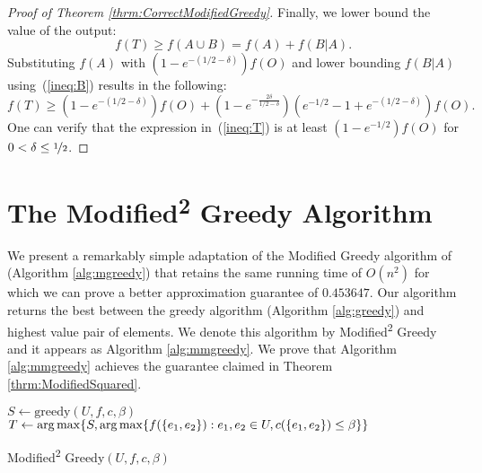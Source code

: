\documentclass[a4paper,UKenglish,cleveref, autoref]{lipics-v2019}
\begin{document}
\begin{proof}[Proof of Theorem \ref{thrm:CorrectModifiedGreedy}]
	Finally, we lower bound the value of the output:
	\begin{equation}
		f(T) \geq f(A \cup B) = f(A) + f(B | A).
	\end{equation}	
	Substituting $f(A)$ with $(1 - e^{-(1/2 - \delta)})f(O)$ and lower bounding $f(B|A)$ using~(\ref{ineq:B}) results in the following:
	\begin{equation}
		\label{ineq:T}
		f(T) \geq (1 - e^{-(1/2 - \delta)})f(O) + (1 - e^{-\frac{2\delta}{1/2 - \delta}})(e^{-1/2} - 1 + e^{-(1/2 - \delta)})f(O).
	\end{equation}
	One can verify that the expression in~(\ref{ineq:T}) is at least $(1-e^{-1/2})f(O)$ for $0 < \delta \leq \nicefrac[]{1}{2}$.
\end{proof}



\section{The Modified\textsuperscript{2} Greedy Algorithm}\label{sec:Modified2Greedy}
We present a remarkably simple adaptation of the Modified Greedy algorithm of \cite{khuller1999budgeted} (Algorithm \ref{alg:mgreedy}) that retains the same running time of $O(n^2)$ for which we can prove a better approximation guarantee of $0.453647$.
Our algorithm returns the best between the greedy algorithm (Algorithm \ref{alg:greedy}) and highest value pair of elements.
We denote this algorithm by Modified\textsuperscript{2} Greedy and it appears as Algorithm \ref{alg:mmgreedy}.
We prove that Algorithm \ref{alg:mmgreedy} achieves the guarantee claimed in Theorem \ref{thrm:ModifiedSquared}.




\begin{algorithm}
	$S \leftarrow \text{greedy}(U, f, c, \beta)$
	\\
	$T \leftarrow \arg\max\{S, \operatorname*{arg\,max} \{ f(\{ e_1,e_2\}):e_1,e_2\in U, c(\{e_1, e_2\} ) \leq \beta \} \}$
	\\
	\caption{Modified\textsuperscript{2} Greedy$(U, f, c, \beta)$}
	\label{alg:mmgreedy}
\end{algorithm}
\end{document}
